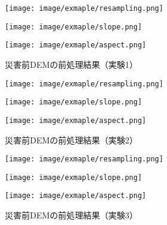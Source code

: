       \begin{figure}[t]
        \begin{minipage}[c]{0.329\hsize}
          \centering
          \texttt{[image: image/exmaple/resampling.png]}
        \end{minipage}
        \begin{minipage}[c]{0.329\hsize}
          \centering
          \texttt{[image: image/exmaple/slope.png]}
        \end{minipage}
        \begin{minipage}[c]{0.329\hsize}
          \centering
          \texttt{[image: image/exmaple/aspect.png]}
        \end{minipage}
        \caption{災害前DEMの前処理結果（実験1）}
        \label{災害前DEMの前処理結果（実験1）}
      \end{figure}

      \begin{figure}[t]
        \begin{minipage}[c]{0.329\hsize}
          \centering
          \texttt{[image: image/exmaple/resampling.png]}
        \end{minipage}
        \begin{minipage}[c]{0.329\hsize}
          \centering
          \texttt{[image: image/exmaple/slope.png]}
        \end{minipage}
        \begin{minipage}[c]{0.329\hsize}
          \centering
          \texttt{[image: image/exmaple/aspect.png]}
        \end{minipage}
        \caption{災害前DEMの前処理結果（実験2）}
      \end{figure}

      \begin{figure}[t]
        \begin{minipage}[c]{0.329\hsize}
          \centering
          \texttt{[image: image/exmaple/resampling.png]}
        \end{minipage}
        \begin{minipage}[c]{0.329\hsize}
          \centering
          \texttt{[image: image/exmaple/slope.png]}
        \end{minipage}
        \begin{minipage}[c]{0.329\hsize}
          \centering
          \texttt{[image: image/exmaple/aspect.png]}
        \end{minipage}
        \caption{災害前DEMの前処理結果（実験3）}
        \label{災害前DEMの前処理結果（実験3）}
      \end{figure}


